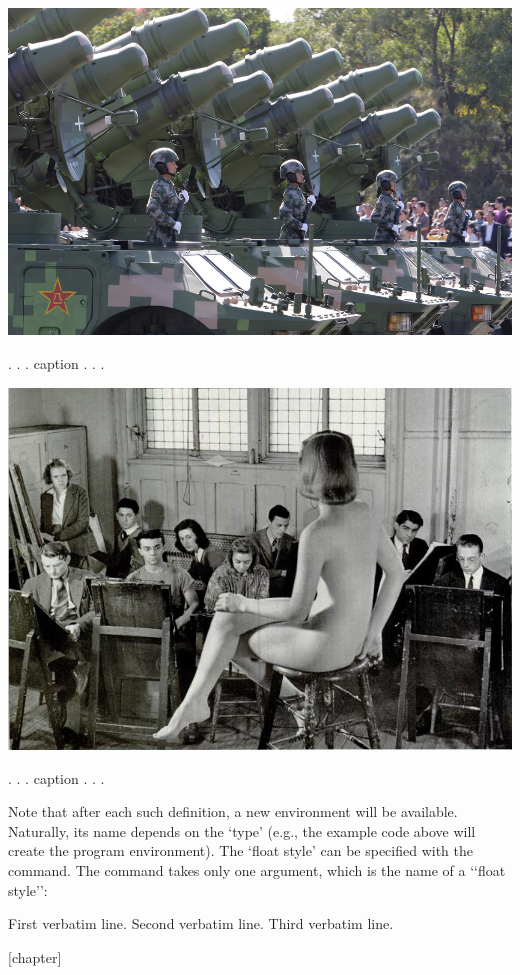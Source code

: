 \begin{Photo}
 \centering
 \includegraphics[width=0.80\linewidth]{./images/china-06.jpg}
\caption{. . . caption . . . }
\end{Photo}

\begin{Photo}
 \centering
 \includegraphics[width=0.65\linewidth]{./images/yaleartschool.png}
\caption{. . . caption . . . }
\end{Photo}



Note that after each such definition, a new 
environment will be available. Naturally,
its name depends on the `type' (e.g., the example code above will create the program
environment). The `float style' can be specified with the  command. The
command takes only one argument, which is the name of a ‘‘float style’’:

\begin{teXXX}
\begin{Example}
     First verbatim line.
     Second verbatim line.
     Third verbatim line.
\end{Example}
\end{teXXX}



[chapter]

